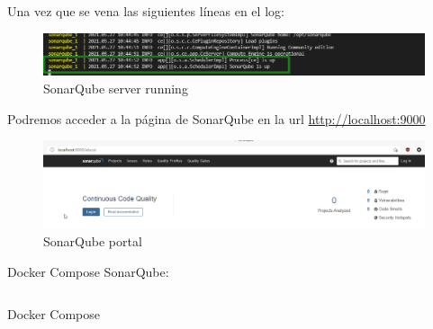 Una vez que se vena las siguientes líneas en el log:
\begin{figure}[h!]  
    \includegraphics[width=\linewidth]{./imagenes/05_SonarQubeServerRunning.png}
    \caption{SonarQube server running}  
    \label{fig:20}
\end{figure}
Podremos acceder a la página de SonarQube en 
la url \href{http://localhost:9000}{http://localhost:9000}\\
\begin{figure}[h!]  
    \includegraphics[width=\linewidth]{./imagenes/06_SonarQubeServer_Webpage.png}
    \caption{SonarQube portal}  
    \label{fig:21}
\end{figure}

Docker Compose SonarQube:\\
\begin{listing}[h!]
    \inputminted{yaml}{./EntornoPruebas/SonarQube_8.2/docker-compose.yml}
    \caption{Docker Compose}
    \label{listing:3}
\end{listing}